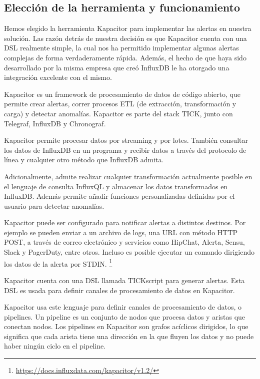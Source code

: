 \subsection{Elección de la herramienta y funcionamiento}
\label{eleccion-herramienta}

Hemos elegido la herramienta Kapacitor para implementar las alertas en nuestra solución. Las razón detrás de nuestra decisión es que Kapacitor cuenta con una DSL realmente simple, la cual nos ha permitido implementar algunas alertas complejas de forma verdaderamente rápida. Además, el hecho de que haya sido desarrollado por la misma empresa que creó InfluxDB le ha otorgado una integración excelente con el mismo.

Kapacitor es un framework de procesamiento de datos de código abierto, que permite crear alertas, correr procesos ETL (de extracción, transformación y carga) y detectar anomalías. Kapacitor es parte del stack TICK, junto con Telegraf, InfluxDB y Chronograf.

Kapacitor permite procesar datos por streaming y por lotes. También consultar los datos de InfluxDB en un programa y recibir datos a través del protocolo de línea y cualquier otro método que InfluxDB admita.

Adicionalmente, admite realizar cualquier transformación actualmente posible en el lenguaje de consulta InfluxQL y almacenar los datos transformados en InfluxDB. Además permite añadir funciones personalizadas definidas por el usuario para detectar anomalías.

Kapacitor puede ser configurado para notificar alertas a distintos destinos. Por ejemplo se pueden enviar a un archivo de logs, una URL con método HTTP POST, a través de correo electrónico y servicios como HipChat, Alerta, Sensu, Slack y PagerDuty, entre otros. Incluso es posible ejecutar un comando dirigiendo los datos de la alerta por STDIN. \footnote{\url{https://docs.influxdata.com/kapacitor/v1.2/}}

Kapacitor cuenta con una DSL llamada TICKscript para generar alertas. Esta DSL es usada para definir canales de procesamiento de datos en Kapacitor.

Kapacitor usa este lenguaje para definir canales de procesamiento de datos, o pipelines. Un pipeline es un conjunto de nodos que procesa datos y aristas que conectan nodos. Los pipelines en Kapacitor son grafos acíclicos dirigidos, lo que significa que cada arista tiene una dirección en la que fluyen los datos y no puede haber ningún ciclo en el pipeline.

